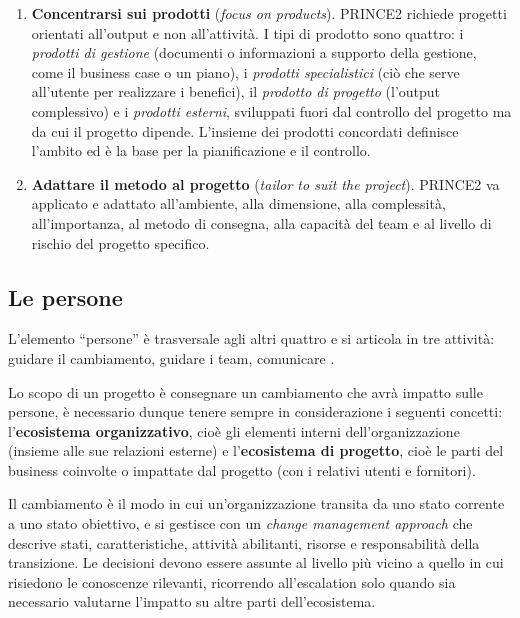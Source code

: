 \begin{enumerate}
pianificato, monitorato e controllato fase per fase, con un minimo di due fasi:
una di inizializzazione e almeno una successiva. Le fasi forniscono punti di
revisione e decisione, consentono di adattarsi ai cambiamenti di contesto,
permettono di prendere le decisioni chiave prima del lavoro di dettaglio che le
implementa e rendono operativa la gestione per eccezione.
\item \textbf{Concentrarsi sui prodotti} (\emph{focus on products}). PRINCE2
richiede progetti orientati all'output e non all'attivit\`a. I tipi di prodotto
sono quattro: i \emph{prodotti di gestione} (documenti o informazioni a supporto
della gestione, come il business case o un piano), i \emph{prodotti
specialistici} (ci\`o che serve all'utente per realizzare i benefici), il
\emph{prodotto di progetto} (l'output complessivo) e i \emph{prodotti esterni},
sviluppati fuori dal controllo del progetto ma da cui il progetto dipende.
L'insieme dei prodotti concordati definisce l'ambito ed \`e la base per la
pianificazione e il controllo.
\item \textbf{Adattare il metodo al progetto} (\emph{tailor to suit the
project}). PRINCE2 va applicato e adattato all'ambiente, alla dimensione, alla
complessit\`a, all'importanza, al metodo di consegna, alla capacit\`a del team e
al livello di rischio del progetto specifico.
\end{enumerate}


\subsection{Le persone}

L'elemento ``persone'' \`e trasversale agli altri quattro e si articola in tre
attivit\`a: guidare il cambiamento, guidare i team, comunicare \cite{prince27}.

Lo scopo di un progetto \`e consegnare un cambiamento che avr\`a impatto sulle
persone, \`e necessario dunque tenere sempre in considerazione i seguenti concetti:
l'\textbf{ecosistema organizzativo}, cio\`e gli elementi
interni dell'organizzazione (insieme alle sue relazioni esterne) e
l'\textbf{ecosistema di progetto}, cio\`e le parti del business coinvolte o
impattate dal progetto (con i relativi utenti e fornitori).

Il cambiamento \`e il
modo in cui un'organizzazione transita da uno stato corrente a uno stato
obiettivo, e si gestisce con un \emph{change management approach} che descrive
stati, caratteristiche, attivit\`a abilitanti, risorse e responsabilit\`a della
transizione. Le decisioni devono essere assunte al livello pi\`u vicino a quello in cui
risiedono le conoscenze rilevanti, ricorrendo all'escalation solo quando sia necessario
valutarne l'impatto su altre parti dell'ecosistema.

